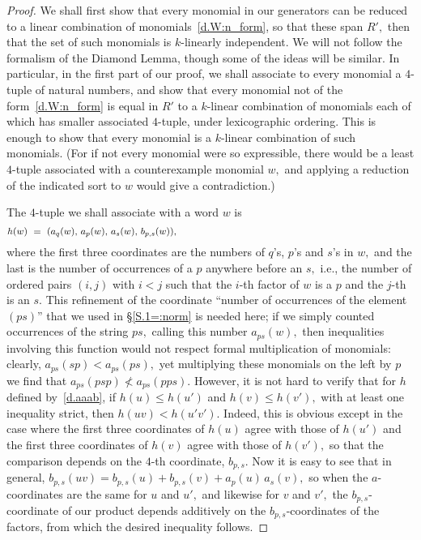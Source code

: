 \documentclass{amsart}
\begin{document}
\begin{proof}
We shall first show that every monomial in our generators can be
reduced to a linear combination of
monomials~\eqref{d.W:n_form}, so that these
span $R',$ then that the set of such
monomials is $\!k\!$-linearly independent.
We will not follow the formalism of the Diamond Lemma, though
some of the ideas will be similar.
In particular, in the first part of our proof,
we shall associate to every monomial a $\!4\!$-tuple of
natural numbers, and show that every monomial not of the
form~\eqref{d.W:n_form} is equal in $R'$ to a $\!k\!$-linear
combination of monomials each of which has smaller
associated $\!4\!$-tuple, under lexicographic ordering.
This is enough to show that every monomial is a $\!k\!$-linear
combination of such monomials.
(For if not every monomial were so expressible,
there would be a least $\!4\!$-tuple associated
with a counterexample monomial $w,$ and applying a reduction of
the indicated sort to $w$ would give a contradiction.)

The $\!4\!$-tuple we shall associate with a word $w$ is
\begin{equation}\begin{minipage}[c]{35pc}\label{d.aaab}
$h(w)\ =\ (a_q(w),\,a_p(w),\,a_s(w),\,b_{p,s}(w)),$
\end{minipage}\end{equation}
where the first three coordinates are the numbers of
$\!q\!$'s, $\!p\!$'s and $\!s\!$'s in $w,$ and the last is
the number of occurrences of a $p$ anywhere before an $s,$
i.e., the number of ordered pairs $(i,j)$ with $i<j$ such
that the $\!i\!$-th factor of $w$ is a $p$ and the $\!j\!$-th is an $s.$
This refinement of the coordinate ``number of occurrences
of the element $(ps)$'' that we used in \S\ref{S.1=:norm} is needed
here; if we simply counted occurrences of the
string $ps,$ calling this number $a_{ps}(w),$ then inequalities
involving this function would not respect formal multiplication
of monomials:  clearly, $a_{ps}(sp)<a_{ps}(ps),$ yet multiplying
these monomials
on the left by $p$ we find that $a_{ps}(psp)\not<a_{ps}(pps).$
However, it is not hard to verify that for $h$
defined by~\eqref{d.aaab}, if
$h(u)\leq h(u')$ and $h(v)\leq h(v'),$ with
at least one inequality strict, then $h(uv)<h(u'v').$
Indeed, this is obvious except in the case where the first three
coordinates of $h(u)$ agree with those of $h(u')$
and the first three coordinates of $h(v)$ agree with those of $h(v'),$
so that the comparison depends on the $\!4\!$-th coordinate, $b_{p,s}.$
Now it is easy to see that in general,
$b_{p,s}(uv) = b_{p,s}(u) + b_{p,s}(v) + a_p(u)\,a_s(v),$ so when
the $\!a\!$-coordinates
are the same for $u$ and $u',$ and likewise for $v$ and $v',$
the $\!b_{p,s}\!$-coordinate of our product depends additively
on the $\!b_{p,s}\!$-coordinates of the factors, from which
the desired inequality follows.


\end{proof}
\end{document}
